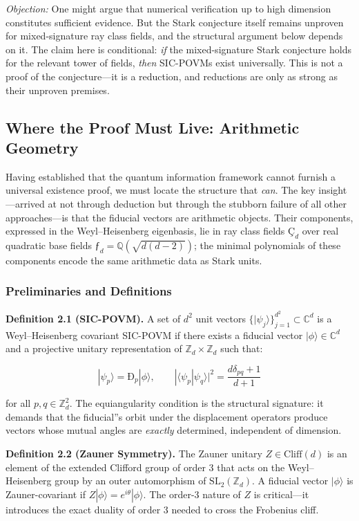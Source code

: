 \documentclass[12pt,a4paper]{article}
\begin{document}
\emph{Objection:} One might argue that numerical verification up to high dimension constitutes sufficient evidence. But the Stark conjecture itself remains unproven for mixed-signature ray class fields, and the structural argument below depends on it. The claim here is conditional: \emph{if} the mixed-signature Stark conjecture holds for the relevant tower of fields, \emph{then} SIC-POVMs exist universally. This is not a proof of the conjecture---it is a reduction, and reductions are only as strong as their unproven premises.

\subsection{Where the Proof Must Live: Arithmetic Geometry}

Having established that the quantum information framework cannot furnish a universal existence proof, we must locate the structure that \emph{can}. The key insight---arrived at not through deduction but through the stubborn failure of all other approaches---is that the fiducial vectors are arithmetic objects. Their components, expressed in the Weyl--Heisenberg eigenbasis, lie in ray class fields $Ç_d$ over real quadratic base fields $ƒ_d = \mathbb{Q}(\sqrt{d(d-2)})$; the minimal polynomials of these components encode the same arithmetic data as Stark units.

\subsubsection{Preliminaries and Definitions}

\textbf{Definition 2.1 (SIC-POVM).} A set of $d^2$ unit vectors $\{|\psi_j\rangle\}_{j=1}^{d^2} \subset \mathbb{C}^d$ is a Weyl--Heisenberg covariant SIC-POVM if there exists a fiducial vector $|\phi\rangle \in \mathbb{C}^d$ and a projective unitary representation of $\mathbb{Z}_d \times \mathbb{Z}_d$ such that:

\[|\psi_p\rangle = Ð_p |\phi\rangle, \qquad |\langle\psi_p | \psi_q\rangle|^2 = \frac{d \delta_{pq} + 1}{d+1}\]

for all $p, q \in \mathbb{Z}_d^2$. The equiangularity condition is the structural signature: it demands that the fiducial''s orbit under the displacement operators produce vectors whose mutual angles are \emph{exactly} determined, independent of dimension.

\textbf{Definition 2.2 (Zauner Symmetry).} The Zauner unitary $Z \in \text{Cliff}(d)$ is an element of the extended Clifford group of order 3 that acts on the Weyl--Heisenberg group by an outer automorphism of $\text{SL}_2(\mathbb{Z}_d)$. A fiducial vector $|\phi\rangle$ is Zauner-covariant if $Z|\phi\rangle = e^{i\theta}|\phi\rangle$. The order-3 nature of $Z$ is critical---it introduces the exact duality of order 3 needed to cross the Frobenius cliff.
\end{document}
